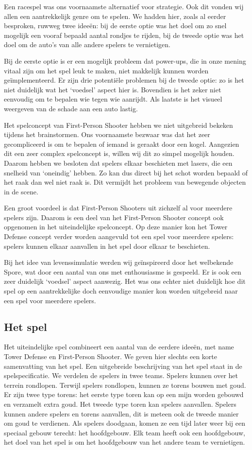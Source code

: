     Een racespel was ons voornaamste alternatief voor strategie. Ook dit vonden wij allen een aantrekkelijk genre om te spelen. We hadden hier, zoals al eerder besproken, ruwweg twee idee\"en: bij de eerste optie was het doel om zo snel mogelijk een vooraf bepaald aantal rondjes te rijden, bij de tweede optie was het doel om de auto's van alle andere spelers te vernietigen.

    Bij de eerste optie is er een mogelijk probleem dat power-ups, die in onze mening vitaal zijn om het spel leuk te maken, niet makkelijk kunnen worden ge\"implementeerd. Er zijn drie potenti\"ele problemen bij de tweede optie: zo is het niet duidelijk wat het `voedsel' aspect hier is. Bovendien is het zeker niet eenvoudig om te bepalen wie tegen wie aanrijdt. Als laatste is het visueel weergeven van de schade aan een auto lastig.

    Het spelconcept van First-Person Shooter hebben we niet uitgebreid bekeken tijdens het brainstormen. Ons voornaamste bezwaar was dat het zeer gecompliceerd is om te bepalen of iemand is geraakt door een kogel. Aangezien dit een zeer complex spelconcept is, willen wij dit zo simpel mogelijk houden. Daarom hebben we besloten dat spelers elkaar beschieten met lasers, die een snelheid van `oneindig' hebben. Zo kan dus direct bij het schot worden bepaald of het raak dan wel niet raak is. Dit vermijdt het probleem van bewegende objecten in de scene.

    Een groot voordeel is dat First-Person Shooters uit zichzelf al voor meerdere spelers zijn. Daarom is een deel van het First-Person Shooter concept ook opgenomen in het uiteindelijke spelconcept. Op deze manier kon het Tower Defense concept verder worden aangevuld tot een spel voor meerdere spelers: spelers kunnen elkaar aanvallen in het spel door elkaar te beschieten.

    Bij het idee van levenssimulatie werden wij ge\"inspireerd door het welbekende Spore, wat door een aantal van ons met enthousiasme is gespeeld. Er is ook een zeer duidelijk `voedsel' aspect aanwezig. Het was ons echter niet duidelijk hoe dit spel op een aantrekkelijke doch eenvoudige manier kon worden uitgebreid naar een spel voor meerdere spelers.

    \subsection{Het spel}
    Het uiteindelijke spel combineert een aantal van de eerdere idee\"en, met name Tower Defense en First-Person Shooter. We geven hier slechts een korte samenvatting van het spel. Een uitgebreide beschrijving van het spel staat in de spelspecificatie. We verdelen de spelers in twee teams. Spelers kunnen over het terrein rondlopen. Terwijl spelers rondlopen, kunnen ze torens bouwen met goud. Er zijn twee type torens: het eerste type toren kan op een mijn worden gebouwd en verzamelt extra goud. Het tweede type toren kan spelers aanvallen. Spelers kunnen andere spelers en torens aanvallen, dit is meteen ook de tweede manier om goud te verdienen. Als spelers doodgaan, komen ze een tijd later weer bij een speciaal gebouw terecht: het hoofdgebouw. Elk team heeft ook een hoofdgebouw, het doel van het spel is om het hoofdgebouw van het andere team te vernietigen.


